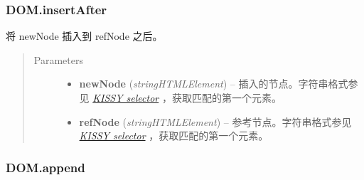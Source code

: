 \documentclass[letterpaper,10pt,english]{sphinxmanual}
\begin{document}
\subsubsection{DOM.insertAfter}
\label{api/core/dom/insertAfter::doc}\label{api/core/dom/insertAfter:dom-insertafter}

\begin{fulllineitems}
\label{api/core/dom/insertAfter:DOM.insertAfter}
将 newNode 插入到 refNode 之后。
\begin{quote}\begin{description}
\item[{Parameters}] \leavevmode\begin{itemize}
\item {}
\textbf{newNode} (\emph{string\textbar{}HTMLElement}) -- 插入的节点。字符串格式参见 {\hyperref[api/core/dom/selector:dom-selector]{\emph{KISSY selector}}} ，获取匹配的第一个元素。

\item {}
\textbf{refNode} (\emph{string\textbar{}HTMLElement}) -- 参考节点。字符串格式参见 {\hyperref[api/core/dom/selector:dom-selector]{\emph{KISSY selector}}} ，获取匹配的第一个元素。

\end{itemize}

\end{description}\end{quote}

\end{fulllineitems}



\subsubsection{DOM.append}
\label{api/core/dom/append:dom-append}\label{api/core/dom/append::doc}
\end{document}
